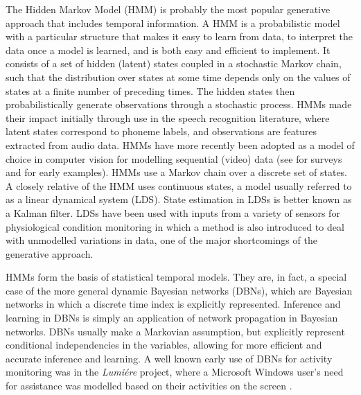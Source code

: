 The Hidden Markov Model (HMM) is probably the most popular generative approach that includes temporal information. A HMM is a probabilistic model with a particular structure that makes it easy to learn from data, to interpret the data once a model is learned, and is both easy and efficient to implement. It consists of a set of hidden (latent) states coupled in a stochastic Markov chain, such that the distribution over states at some time depends only on the values of states at a finite number of preceding times. The hidden states then probabilistically generate observations through a stochastic process. HMMs made their impact initially through use in the speech recognition literature, where latent states correspond to phoneme labels, and observations are features extracted from audio data. HMMs have more recently been adopted as a model of choice in computer vision for modelling sequential (video) data (see \cite{Gavrila1999} \cite{Moeslund2006} for surveys and \cite{Galata1999} \cite{Starner1995} for early examples). HMMs use a Markov chain over a discrete set of states. A closely relative of the HMM uses continuous states, a model usually referred to as a linear dynamical system (LDS). State estimation in LDSs is better known as a Kalman filter. LDSs have been used with inputs from a variety of sensors for physiological condition monitoring \cite{Quinn2009} in which a method is also introduced to deal with unmodelled variations in data, one of the major shortcomings of the generative approach.

HMMs form the basis of statistical temporal models. They are, in fact, a special case of the more general dynamic Bayesian networks (DBNs), which are Bayesian networks in which a discrete time index is explicitly represented. Inference and learning in DBNs is simply an application of network propagation in Bayesian networks. DBNs usually make a Markovian assumption, but explicitly represent conditional independencies in the variables, allowing for more efficient and accurate inference and learning. A well known early use of DBNs for activity monitoring was in the \textit{Lumi\'ere} project, where a Microsoft Windows user’s need for assistance was modelled based on their activities on the screen \cite{Horvitz1998}.

